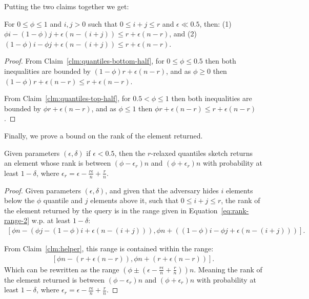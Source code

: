 Putting the two claims together we get:

\begin{claim}
    For $0 \leq \phi \leq 1$ and $i,j>0$ such that $0 \leq i+j \leq r$ and $\epsilon \ll 0.5$, then: (1) $\phi i - (1-\phi)j + \epsilon(n-(i+j)) \leq r + \epsilon(n-r)$,
    and (2) $(1-\phi)i - \phi j + \epsilon(n-(i+j)) \leq r + \epsilon(n-r)$.
    \label{clm:helper}
\end{claim}
\begin{proof}
    From Claim~\ref{clm:quantiles-bottom-half}, for $0 \leq \phi \leq 0.5$ then both inequalities are bounded by $(1-\phi) r + \epsilon(n-r)$, and as $\phi \geq 0$ then
    $(1-\phi) r + \epsilon(n-r) \leq r + \epsilon(n-r)$.

    From Claim~\ref{clm:quantiles-top-half}, for $0.5 < \phi \leq 1$ then both inequalities are bounded by $\phi r + \epsilon(n-r)$, and as $\phi \leq 1$ then
    $\phi r + \epsilon(n-r) \leq r + \epsilon(n-r)$.
\end{proof}

Finally, we prove a bound on the rank of the element returned. 
\begin{lemma}
    Given parameters $(\epsilon,\delta)$ if $\epsilon<0.5$, then the $r$-relaxed
    quantiles sketch returns an element whose rank is
    between $(\phi-\epsilon_r)n$ and $(\phi+\epsilon_r)n$ with probability at
    least $1-\delta$, where $\epsilon_r=\epsilon - \frac{r \epsilon}{n} + \frac{r}{n}$.
    \label{lemma:quantiles-weak-adversary}
\end{lemma}
\begin{proof}
    Given parameters $(\epsilon,\delta)$, and given that the adversary hides $i$ elements below the
    $\phi$ quantile and $j$ elements above it, such that $0\leq i+j\leq r$, the rank of the element returned
    by the query is in the range given in Equation~\ref{eq:rank-range-2} w.p. at least $1-\delta$:
    \begin{align*}
        \left[\phi n - (\phi j - (1-\phi)i+\epsilon(n-(i+j))), \phi n + ((1-\phi)i - \phi j +\epsilon(n-(i+j))) \right].
    \end{align*}

    From Claim~\ref{clm:helper}, this range is contained within the range:
    \begin{align*}
        \left[\phi n - (r + \epsilon(n-r)), \phi n + (r + \epsilon(n-r)) \right].
    \end{align*}
    Which can be rewritten as the range $\left(\phi \pm \left(\epsilon - \frac{r \epsilon}{n} + \frac{r}{n}\right)\right)n$.
    Meaning the rank of the element returned is between $(\phi-\epsilon_r)n$ and $(\phi+\epsilon_r)n$ with probability at
    least $1-\delta$, where $\epsilon_r=\epsilon - \frac{r \epsilon}{n} + \frac{r}{n}$.
\end{proof}